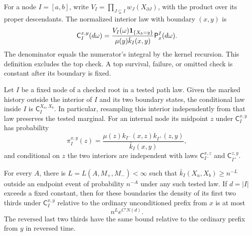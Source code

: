 For a node $I=[a,b]$, write
$V_I=\prod_{J\subsetneq I}w_J(X_{\partial J})$, with the product over its
proper descendants.  The normalized interior law with boundary $(x,y)$ is
\begin{equation}\label{hist:bridge-definition}
 \mathsf C_I^{x,y}(d\omega)
 =\frac{V_I(\omega)\mathbf 1_{\{X_b=y\}}}{\mu(y)\bar k_I(x,y)}
             \mathsf P_x^I(d\omega).
\end{equation}
The denominator equals the numerator's integral by the kernel recursion.
This definition excludes the top check.  A top survival, failure, or omitted
check is constant after its boundary is fixed.

\begin{lemma}\label{hist:conditional-interior}
Let $I$ be a fixed node of a checked root in a tested path law.  Given the marked
history outside the interior of $I$ and its two boundary states, the
conditional law inside $I$ is $\mathsf C_I^{X_a,X_b}$.  In particular,
resampling this interior independently from that law preserves the tested
marginal.  For an internal node its midpoint $z$ under $\mathsf C_I^{x,y}$
has probability
\begin{equation}\label{hist:midpoint-probability}
 \pi_I^{x,y}(z)=
   \frac{\mu(z)k_{I^-}(x,z)k_{I^+}(z,y)}{\bar k_I(x,y)},
\end{equation}
and conditional on $z$ the two interiors are independent with laws
$\mathsf C_{I^-}^{x,z}$ and $\mathsf C_{I^+}^{z,y}$.

For every $A$, there is $L=L(A,M_+,M_-)<\infty$ such that
$\bar k_I(X_a,X_b)\ge n^{-L}$ outside an endpoint event of probability
$n^{-A}$ under any such tested law.  If $d=|I|$ exceeds a fixed constant,
then for these boundaries the density of its first two thirds under
$\mathsf C_I^{x,y}$ relative to the ordinary unconditioned prefix from $x$
is at most
\begin{equation}\label{hist:prefix-density}
 n^L e^{C'N(d)}.
\end{equation}
The reversed last two thirds have the same bound relative to the ordinary
prefix from $y$ in reversed time.
\end{lemma}


